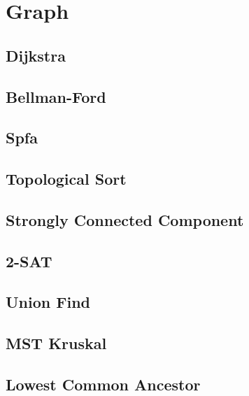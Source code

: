 \documentclass[10pt,landscape,a4paper,twocolumn]{article}
\begin{document}
\section{Graph}

\subsection{Dijkstra}


\subsection{Bellman-Ford}


\subsection{Spfa}


\subsection{Topological Sort}


\subsection{Strongly Connected Component}


\subsection{2-SAT}


\subsection{Union Find}


\subsection{MST Kruskal}


\subsection{Lowest Common Ancestor}

\end{document}
